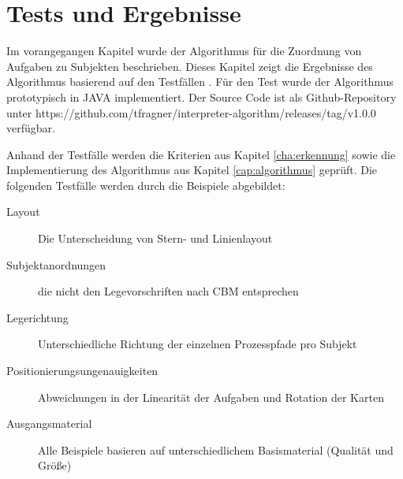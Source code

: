 %
%
% 
% 
% 


\chapter{Tests und Ergebnisse}
\label{chap:Ergebnisse}
Im vorangegangen Kapitel wurde der Algorithmus für die Zuordnung von Aufgaben zu Subjekten beschrieben. Dieses Kapitel zeigt die Ergebnisse des Algorithmus basierend auf den Testfällen \cite{max}. Für den Test wurde der Algorithmus prototypisch in JAVA implementiert. Der Source Code ist als Github-Repository unter https://github.com/tfragner/interpreter-algorithm/releases/tag/v1.0.0 verfügbar.

Anhand der Testfälle werden die Kriterien aus Kapitel \ref{cha:erkennung} sowie die Implementierung des Algorithmus aus Kapitel \ref{cap:algorithmus} geprüft. Die folgenden Testfälle werden durch die Beispiele abgebildet: 
\begin{description}
	\item[Layout] Die Unterscheidung von Stern- und Linienlayout
	\item[Subjektanordnungen] die nicht den Legevorschriften nach CBM entsprechen
	\item[Legerichtung] Unterschiedliche Richtung der einzelnen Prozesspfade pro Subjekt
	\item[Positionierungsungenauigkeiten] Abweichungen in der Linearität der Aufgaben und Rotation der Karten
	\item[Ausgangsmaterial] Alle Beispiele basieren auf unterschiedlichem Basismaterial (Qualität und Größe)
\end{description}
\newpage

